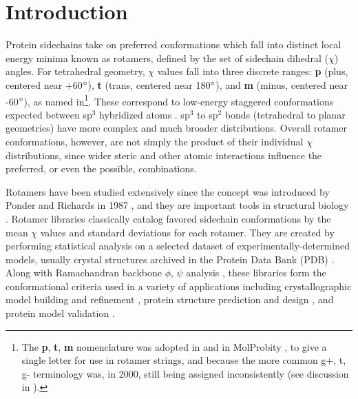 \section{Introduction}
Protein sidechains take on preferred conformations which fall into distinct local energy minima known as rotamers, defined by the set of sidechain dihedral ($\chi$) angles. For tetrahedral geometry, $\chi$ values fall into three discrete ranges: \textbf{p} (plus, centered near +60$\degree$), \textbf{t} (trans, centered near 180$\degree$), and \textbf{m} (minus, centered near -60$\degree$)\textcolor{changecolor}{, as named in\cite{lovell2000penultimate}\footnote{\textcolor{changecolor}{The \textbf{p}, \textbf{t}, \textbf{m} nomenclature was adopted in \cite{lovell2000penultimate} and in MolProbity \cite{Davis2004}, to give a single letter for use in rotamer strings, and because the more common g+, t, g- terminology was, in 2000, still being assigned inconsistently (see discussion in \cite{lovell2000penultimate}).}}}. These correspond to low-energy staggered conformations expected between sp$^{3}$ hybridized atoms \cite{Eyring1932}. sp$^{3}$ to sp$^{2}$ bonds (tetrahedral to planar geometries) have more complex and much broader distributions. Overall rotamer conformations, however, are not simply the product of their individual $\chi$ distributions, since wider steric and other atomic interactions influence the preferred, or even the possible, combinations.

Rotamers have been studied extensively since the concept was introduced by Ponder and Richards in 1987 \cite{Ponder1987}, and they are important tools in structural biology \cite{DunbrackJr2002431}. Rotamer libraries classically catalog favored sidechain conformations by the mean $\chi$ values and standard deviations for each rotamer. They are created by performing statistical analysis on a selected dataset of experimentally-determined models, usually crystal structures archived in the Protein Data Bank (PDB) \cite{Berman2000}. Along with Ramachandran backbone $\phi$, $\psi$ analysis \cite{RAMACHANDRAN1963,JSR_theplot_2013}, these libraries form the conformational criteria used in a variety of applications including crystallographic model building and refinement \textcolor{changecolor}{\cite{Arendall2005, Emsley:ba5144, Adams:2010fk, Winn2011, Joosten2012}}, protein structure prediction and design \cite{Bower1997, Kuhlman21112003, Gainza:2012}, and protein model validation \cite{Laskowski:gl0276, Hooft1996, Chen:2010kx}.

